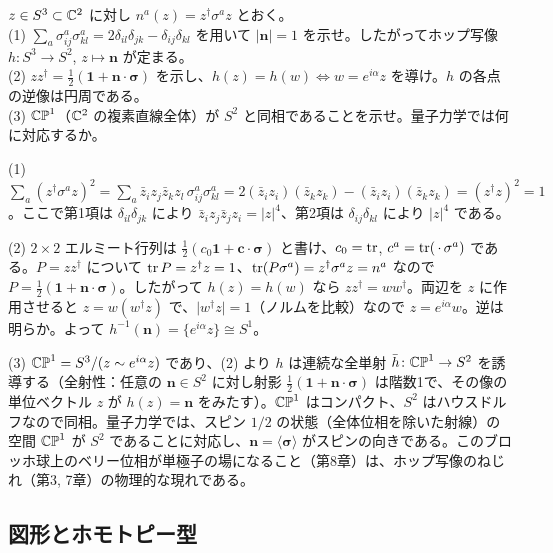 \begin{problem}[難易度 B]\label{ch01-prob-hopf}
$z\in S^3\subset\mathbb{C}^2$ に対し $n^a(z)=z^\dagger\sigma^az$ とおく。\\
(1) $\sum_a\sigma^a_{ij}\sigma^a_{kl}=2\delta_{il}\delta_{jk}-\delta_{ij}\delta_{kl}$ を用いて $\lvert\bm n\rvert=1$ を示せ。したがってホップ写像 $h\colon S^3\to S^2$, $z\mapsto\bm n$ が定まる。\\
(2) $zz^\dagger=\tfrac12(\mathbf 1+\bm n\cdot\bm\sigma)$ を示し、$h(z)=h(w)\iff w=e^{i\alpha}z$ を導け。$h$ の各点の逆像は円周である。\\
(3) $\mathbb{CP}^1$（$\mathbb{C}^2$ の複素直線全体）が $S^2$ と同相であることを示せ。量子力学では何に対応するか。
\end{problem}

\begin{solution}
(1) $\sum_a(z^\dagger\sigma^az)^2=\sum_a\bar z_iz_j\bar z_kz_l\,\sigma^a_{ij}\sigma^a_{kl}=2(\bar z_iz_i)(\bar z_kz_k)-(\bar z_iz_i)(\bar z_kz_k)=(z^\dagger z)^2=1$。ここで第1項は $\delta_{il}\delta_{jk}$ により $\bar z_iz_j\bar z_jz_i=\lvert z\rvert^4$、第2項は $\delta_{ij}\delta_{kl}$ により $\lvert z\rvert^4$ である。

(2) $2\times2$ エルミート行列は $\tfrac12(c_0\mathbf 1+\bm c\cdot\bm\sigma)$ と書け、$c_0=\tr$, $c^a=\tr(\,\cdot\,\sigma^a)$ である。$P=zz^\dagger$ について $\tr P=z^\dagger z=1$、$\tr(P\sigma^a)=z^\dagger\sigma^az=n^a$ なので $P=\tfrac12(\mathbf 1+\bm n\cdot\bm\sigma)$。したがって $h(z)=h(w)$ なら $zz^\dagger=ww^\dagger$。両辺を $z$ に作用させると $z=w(w^\dagger z)$ で、$\lvert w^\dagger z\rvert=1$（ノルムを比較）なので $z=e^{i\alpha}w$。逆は明らか。よって $h^{-1}(\bm n)=\{e^{i\alpha}z\}\cong S^1$。

(3) $\mathbb{CP}^1=S^3/(z\sim e^{i\alpha}z)$ であり、(2) より $h$ は連続な全単射 $\bar h\colon\mathbb{CP}^1\to S^2$ を誘導する（全射性：任意の $\bm n\in S^2$ に対し射影 $\tfrac12(\mathbf 1+\bm n\cdot\bm\sigma)$ は階数1で、その像の単位ベクトル $z$ が $h(z)=\bm n$ をみたす）。$\mathbb{CP}^1$ はコンパクト、$S^2$ はハウスドルフなので同相。量子力学では、スピン $1/2$ の状態（全体位相を除いた射線）の空間 $\mathbb{CP}^1$ が $S^2$ であることに対応し、$\bm n=\langle\bm\sigma\rangle$ がスピンの向きである。このブロッホ球上のベリー位相が単極子の場になること（第8章）は、ホップ写像のねじれ（第3, 7章）の物理的な現れである。
\end{solution}

\subsection{図形とホモトピー型}

